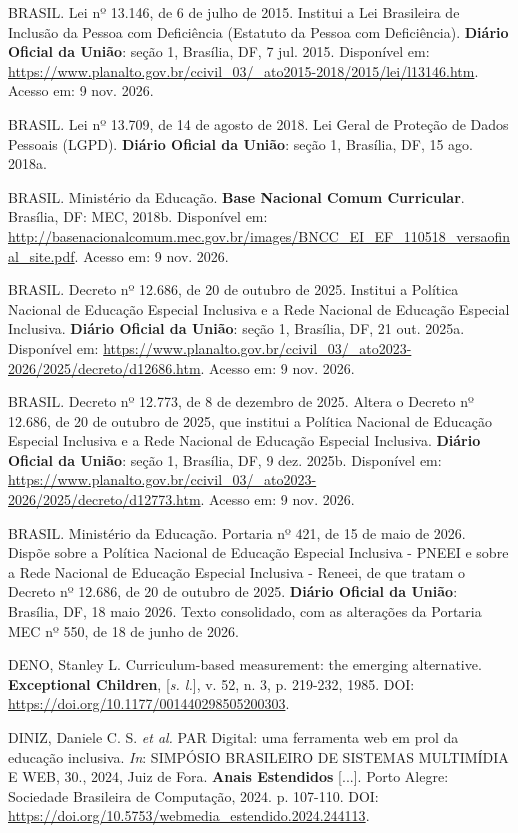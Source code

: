 \begin{referenciasIFTO}
BRASIL. Lei nº 13.146, de 6 de julho de 2015. Institui a Lei Brasileira de Inclusão da Pessoa com Deficiência (Estatuto da Pessoa com Deficiência). \textbf{Diário Oficial da União}: seção 1, Brasília, DF, 7 jul. 2015. Disponível em: \url{https://www.planalto.gov.br/ccivil_03/_ato2015-2018/2015/lei/l13146.htm}. Acesso em: 9 nov. 2026.

BRASIL. Lei nº 13.709, de 14 de agosto de 2018. Lei Geral de Proteção de Dados Pessoais (LGPD). \textbf{Diário Oficial da União}: seção 1, Brasília, DF, 15 ago. 2018a.

BRASIL. Ministério da Educação. \textbf{Base Nacional Comum Curricular}. Brasília, DF: MEC, 2018b. Disponível em: \url{http://basenacionalcomum.mec.gov.br/images/BNCC_EI_EF_110518_versaofinal_site.pdf}. Acesso em: 9 nov. 2026.

BRASIL. Decreto nº 12.686, de 20 de outubro de 2025. Institui a Política Nacional de Educação Especial Inclusiva e a Rede Nacional de Educação Especial Inclusiva. \textbf{Diário Oficial da União}: seção 1, Brasília, DF, 21 out. 2025a. Disponível em: \url{https://www.planalto.gov.br/ccivil_03/_ato2023-2026/2025/decreto/d12686.htm}. Acesso em: 9 nov. 2026.

BRASIL. Decreto nº 12.773, de 8 de dezembro de 2025. Altera o Decreto nº 12.686, de 20 de outubro de 2025, que institui a Política Nacional de Educação Especial Inclusiva e a Rede Nacional de Educação Especial Inclusiva. \textbf{Diário Oficial da União}: seção 1, Brasília, DF, 9 dez. 2025b. Disponível em: \url{https://www.planalto.gov.br/ccivil_03/_ato2023-2026/2025/decreto/d12773.htm}. Acesso em: 9 nov. 2026.

BRASIL. Ministério da Educação. Portaria nº 421, de 15 de maio de 2026. Dispõe sobre a Política Nacional de Educação Especial Inclusiva - PNEEI e sobre a Rede Nacional de Educação Especial Inclusiva - Reneei, de que tratam o Decreto nº 12.686, de 20 de outubro de 2025. \textbf{Diário Oficial da União}: Brasília, DF, 18 maio 2026. Texto consolidado, com as alterações da Portaria MEC nº 550, de 18 de junho de 2026.

DENO, Stanley L. Curriculum-based measurement: the emerging alternative. \textbf{Exceptional Children}, [\textit{s. l.}], v. 52, n. 3, p. 219-232, 1985. DOI: \url{https://doi.org/10.1177/001440298505200303}.

DINIZ, Daniele C. S. \textit{et al.} PAR Digital: uma ferramenta web em prol da educação inclusiva. \textit{In}: SIMPÓSIO BRASILEIRO DE SISTEMAS MULTIMÍDIA E WEB, 30., 2024, Juiz de Fora. \textbf{Anais Estendidos} [...]. Porto Alegre: Sociedade Brasileira de Computação, 2024. p. 107-110. DOI: \url{https://doi.org/10.5753/webmedia_estendido.2024.244113}.


\end{referenciasIFTO}
